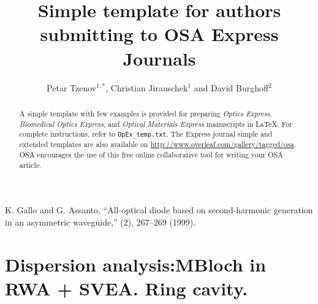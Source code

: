 \documentclass[10pt,letterpaper]{article}
\begin{document}
	
	\title{Simple template for authors submitting to OSA Express Journals}
	
	\author{Petar Tzenov$^{1,*}$, Christian Jirauschek$^1$ and David Burghoff$^{2}$}
	
	\address{$^1$ Institute for Nanoelectronics, Technische Universit\''at M\''unchen, D-80333 Munich, Germany}
	\address{$^2$ Somewhere in MIT, US}
	
	
	
	
	\begin{abstract}
		A simple template with few examples is provided for preparing \textit{Optics Express}, \textit{Biomedical Optics Express}, and \textit{Optical Materials Express} manuscripts in \LaTeX. For complete instructions, refer to \texttt{OpEx\_temp.txt}. The Express journal simple and extended templates are also available on \url{http://www.overleaf.com/gallery/tagged/osa}. OSA encourages the use of this free online collaborative tool for writing your OSA article.
	\end{abstract}
	
	
	\begin{thebibliography}{99}
		
		 K. Gallo and G. Assanto, ``All-optical diode based on second-harmonic generation in an asymmetric waveguide,'' (2), 267--269 (1999).
	\end{thebibliography}
	
	\section{Dispersion analysis:MBloch in RWA + SVEA. Ring cavity.}
	
\end{document}
